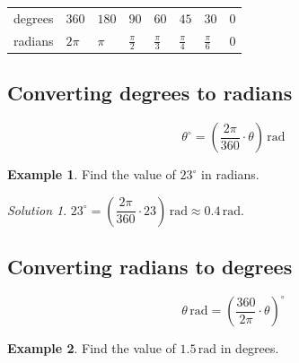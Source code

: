 \documentclass[
  english,
  12pt,
  oneside]{book}
\newcounter{none} %
\theoremstyle{definition}
\theoremstyle{definition}
\newtheorem{example}{Example}[chapter]
\theoremstyle{definition}
\theoremstyle{definition}
\theoremstyle{remark}
\newtheorem*{solution}{Solution}
\begin{document}
{\def\LTcaptype{none} %
\begin{longtable}[]{@{}
  >{\raggedright\arraybackslash}p{}
  >{\centering\arraybackslash}p{}
  >{\centering\arraybackslash}p{}
  >{\centering\arraybackslash}p{}
  >{\centering\arraybackslash}p{}
  >{\centering\arraybackslash}p{}
  >{\centering\arraybackslash}p{}
  >{\centering\arraybackslash}p{}@{}}
\toprule\noalign{}
\endhead
\bottomrule\noalign{}
\endlastfoot
degrees & \(360\) & \(180\) & \(90\) & \(60\) & \(45\) & \(30\) & \(0\) \\
radians & \(2\pi\) & \(\pi\) & \(\frac{\pi}{2}\) & \(\frac{\pi}{3}\) & \(\frac{\pi}{4}\) & \(\frac{\pi}{6}\) & \(0\) \\
\end{longtable}
}

\subsection{Converting degrees to radians}\label{converting-degrees-to-radians}

\[\theta^\circ = \left(\dfrac{2\pi}{360}\cdot\theta\right)\,\mathrm{rad}\]

\begin{example}
Find the value of \(23^\circ\) in radians.
\end{example}

\begin{solution}
\(23^\circ = \left(\dfrac{2\pi}{360}\cdot 23\right)\,\mathrm{rad} \approx 0.4\,\mathrm{rad}\).
\end{solution}

\subsection{Converting radians to degrees}\label{converting-radians-to-degrees}

\[\theta\,\mathrm{rad}=\left(\dfrac{360}{2\pi}\cdot\theta\right)^\circ\]

\begin{example}
Find the value of \(1.5\,\mathrm{rad}\) in degrees.
\end{example}
\end{document}
